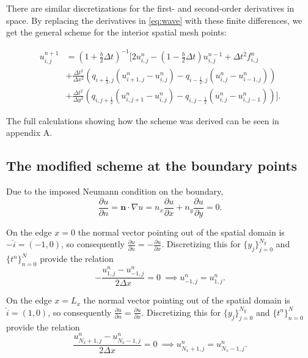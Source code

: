 \documentclass[twoside]{article}
\begin{document}
There are similar discretizations for the first- and second-order derivatives in space. By replacing the derivatives in \eqref{eq:wave} with these finite differences, we get the general scheme for the interior
spatial mesh points:

\begin{align}
u_{i,j}^{n+1} &= (1+\frac{b}{2}\Delta t)^{-1} \bigg[2u_{i,j}^n - (1-\frac{b}{2}\Delta t) u_{i,j}^{n-1} + \Delta t^2 f_{i,j}^n \nonumber \\
&+ \frac{\Delta t^2}{\Delta x^2} \left(q_{i+\frac{1}{2},j} (u_{i+1,j}^n - u_{i,j}^n) -  q_{i-\frac{1}{2},j} (u_{i,j}^n - u_{i-1,j}^n) \right) \\
&+ \frac{\Delta t^2}{\Delta y^2} \left(q_{i,j+\frac{1}{2}} (u_{i,j+1}^n - u_{i,j}^n) -  q_{i,j-\frac{1}{2}} (u_{i,j}^n - u_{i,j-1}^n) \right) \bigg]. \nonumber
\end{align}

The full calculations showing how the scheme was derived can be seen in appendix A.


\subsection{The modified scheme at the boundary points}
\label{boundary:conditions}

Due to the imposed Neumann condition on the boundary,
\begin{equation*}
\frac{\partial u}{\partial n} = \mathbf{n} \cdot \nabla u = n_x\frac{\partial u}{\partial x} + n_y \frac{\partial u}{\partial y} = 0. 
\end{equation*}

On the edge $x=0$ the normal vector pointing out of the spatial domain is $-\hat{i} = (-1,0)$, so consequently $\frac{\partial u}{\partial n} = -\frac{\partial u}{\partial x}$.
Discretizing this for $\{y_j\}_{j=0}^{N_y}$ and $\{t^n\}_{n=0}^N$ provide the relation
\begin{equation}
-\frac{u_{1,j}^n - u_{-1,j}^n}{2\Delta x} = 0 \ \implies u_{-1,j}^n = u_{1,j}^n.
\label{bc:x0}
\end{equation}


On the edge $x=L_x$ the normal vector pointing out of the spatial domain is $\hat{i} = (1,0)$, so consequently $\frac{\partial u}{\partial n} = \frac{\partial u}{\partial x}$.
Discretizing this for $\{y_j\}_{j=0}^{N_y}$ and $\{t^n\}_{n=0}^N$ provide the relation
\begin{equation}
\frac{u_{N_x + 1,j}^n - u_{N_x - 1,j}^n}{2\Delta x} = 0 \ \implies u_{N_x + 1,j}^n = u_{N_x - 1,j}^n.
\label{bc:xL}
\end{equation}
\end{document}

